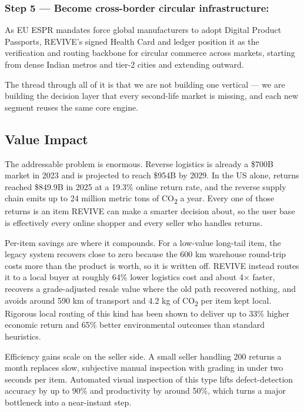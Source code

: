 \documentclass[11pt]{article}
\newcommand{\placeholder}[1]{{\color{placeGray} #1}}
\begin{document}
\subsubsection*{\color{amznSlate} Step 5 --- Become cross-border circular infrastructure:}
\placeholder{As EU ESPR mandates force global manufacturers to adopt Digital Product Passports, REVIVE's signed Health Card and ledger position it as the verification and routing backbone for circular commerce across markets, starting from dense Indian metros and tier-2 cities and extending outward.}

\vspace{6pt}
\placeholder{The thread through all of it is that we are not building one vertical --- we are building the decision layer that every second-life market is missing, and each new segment reuses the same core engine.}

\subsection{Value Impact}

\placeholder{The addressable problem is enormous. Reverse logistics is already a \$700B market in 2023 and is projected to reach \$954B by 2029. In the US alone, returns reached \$849.9B in 2025 at a 19.3\% online return rate, and the reverse supply chain emits up to 24 million metric tons of CO\textsubscript{2} a year. Every one of those returns is an item REVIVE can make a smarter decision about, so the user base is effectively every online shopper and every seller who handles returns.}

\placeholder{Per-item savings are where it compounds. For a low-value long-tail item, the legacy system recovers close to zero because the 600 km warehouse round-trip costs more than the product is worth, so it is written off. REVIVE instead routes it to a local buyer at roughly 64\% lower logistics cost and about 4$\times$ faster, recovers a grade-adjusted resale value where the old path recovered nothing, and avoids around 590 km of transport and 4.2 kg of CO\textsubscript{2} per item kept local. Rigorous local routing of this kind has been shown to deliver up to 33\% higher economic return and 65\% better environmental outcomes than standard heuristics.}

\placeholder{Efficiency gains scale on the seller side. A small seller handling 200 returns a month replaces slow, subjective manual inspection with grading in under two seconds per item. Automated visual inspection of this type lifts defect-detection accuracy by up to 90\% and productivity by around 50\%, which turns a major bottleneck into a near-instant step.}
\end{document}
